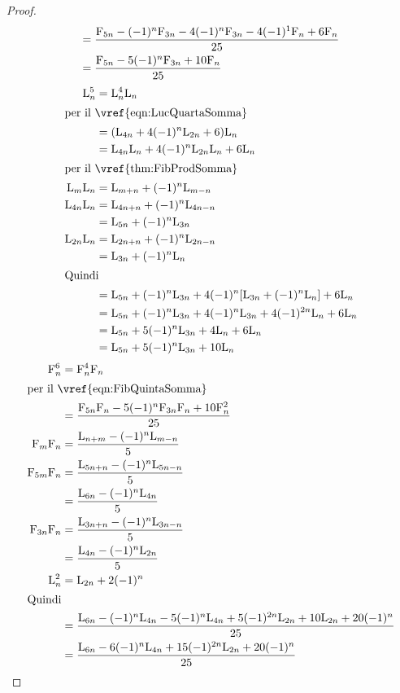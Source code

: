 \begin{proof}
\begin{align*}
	={}&\dfrac{\mathrm{F}_{5n}-(-1)^{n}\mathrm{F}_{3n}-4(-1)^n\mathrm{F}_{3n}-4(-1)^{1}\mathrm{F}_{n}+6\mathrm{F}_{n}}{25}\\
	={}&\dfrac{\mathrm{F}_{5n}-5(-1)^n\mathrm{F}_{3n}+10\mathrm{F}_{n}}{25}\\
\end{align*}
\begin{align*}
	\Luc{n}^5={}&\Luc{n}^4\Luc{n}\\
	\intertext{per il~\vref{eqn:LucQuartaSomma}}
	={}&(\Luc{4n}+4(-1)^n\Luc{2n}+6)\Luc{n}\\
	={}&\Luc{4n}\Luc{n}+4(-1)^n\Luc{2n}\Luc{n}+6\Luc{n}\\
	\intertext{per il~\vref{thm:FibProdSomma}}
	\Luc{m}\Luc{n}={}&\Luc{m+n}+(-1)^{n}\Luc{m-n}\\
	\Luc{4n}\Luc{n}={}&\Luc{4n+n}+(-1)^{n}\Luc{4n-n}\\
	={}&\Luc{5n}+(-1)^{n}\Luc{3n}\\
	\Luc{2n}\Luc{n}={}&\Luc{2n+n}+(-1)^{n}\Luc{2n-n}\\
	={}&\Luc{3n}+(-1)^{n}\Luc{n}\\
	\intertext{Quindi}
	={}&\Luc{5n}+(-1)^{n}\Luc{3n}+4(-1)^n[\Luc{3n}+(-1)^{n}\Luc{n}]+6\Luc{n}\\
	={}&\Luc{5n}+(-1)^{n}\Luc{3n}+4(-1)^n\Luc{3n}+4(-1)^{2n}\Luc{n}+6\Luc{n}\\
	={}&\Luc{5n}+5(-1)^n\Luc{3n}+4\Luc{n}+6\Luc{n}\\
	={}&\Luc{5n}+5(-1)^n\Luc{3n}+10\Luc{n}\\
\end{align*}
\begin{align*}
	\Fib{n}^6={}&\Fib{n}^4\Fib{n}\\
	\intertext{per il~\vref{eqn:FibQuintaSomma}}
	={}&\dfrac{\Fib{5n}\Fib{n}-5(-1)^n\Fib{3n}\Fib{n}+10\Fib{n}^2}{25}\\
	\Fib{m}\Fib{n}={}&\dfrac{\Luc{n+m}-(-1)^n\Luc{m-n}}{5}\\
	\Fib{5m}\Fib{n}={}&\dfrac{\Luc{5n+n}-(-1)^n\Luc{5n-n}}{5}\\
	={}&\dfrac{\Luc{6n}-(-1)^n\Luc{4n}}{5}\\
	\Fib{3n}\Fib{n}={}&\dfrac{\Luc{3n+n}-(-1)^n\Luc{3n-n}}{5}\\
	={}&\dfrac{\Luc{4n}-(-1)^n\Luc{2n}}{5}\\
	\Luc{n}^2={}&\Luc{2n}+2(-1)^n\\
	\intertext{Quindi}
	={}&\dfrac{\Luc{6n}-(-1)^n\Luc{4n}-5(-1)^n\Luc{4n}+5(-1)^{2n}\Luc{2n}+10\Luc{2n}+20(-1)^n}{25}\\
	={}&\dfrac{\Luc{6n}-6(-1)^n\Luc{4n}+15(-1)^{2n}\Luc{2n}+20(-1)^n}{25}\\

\end{align*}
\end{proof}
